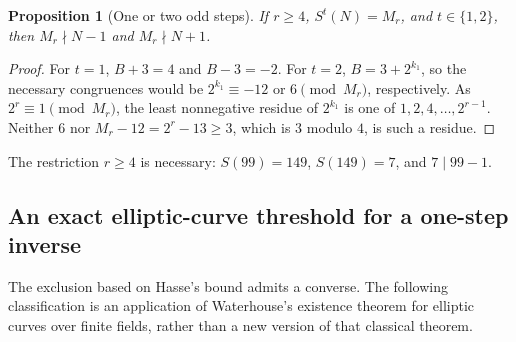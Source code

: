 \documentclass[11pt,a4paper]{article}
\newtheorem{proposition}[theorem]{Proposition}
\theoremstyle{definition}
\theoremstyle{remark}
\numberwithin{equation}{section}
\begin{document}
\begin{proposition}[One or two odd steps]
If $r\ge4$, $S^t(N)=M_r$, and $t\in\{1,2\}$, then
$M_r\nmid N-1$ and $M_r\nmid N+1$.
\end{proposition}
\begin{proof}
For $t=1$, $B+3=4$ and $B-3=-2$.
For $t=2$, $B=3+2^{k_1}$, so the necessary congruences would be
$2^{k_1}\equiv-12$ or $6\pmod{M_r}$, respectively.
As $2^r\equiv1\pmod{M_r}$, the least nonnegative residue of
$2^{k_1}$ is one of $1,2,4,\ldots,2^{r-1}$. Neither $6$ nor
$M_r-12=2^r-13\ge3$, which is $3$ modulo $4$, is such a residue.
\end{proof}
The restriction $r\ge4$ is necessary: $S(99)=149$, $S(149)=7$,
and $7\mid99-1$.

\subsection{An exact elliptic-curve threshold for a one-step inverse}
The exclusion based on Hasse's bound admits a converse. The following
classification is an application of Waterhouse's existence theorem for
elliptic curves over finite fields, rather than a new version of that
classical theorem.
\end{document}
